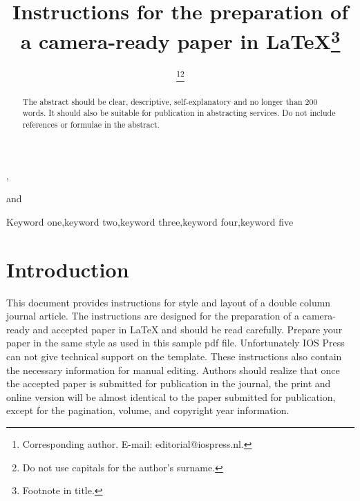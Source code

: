 \documentclass{iosart2c}
\begin{document}
\begin{frontmatter}                           %

%
\title{Instructions for the preparation of a camera-ready paper in \LaTeX\thanks{Footnote in title.}}




\author[A]{ \thanks{Corresponding author. E-mail: editorial@iospress.nl.}\thanks{Do not use capitals for the author's surname.}},
\author[B]{ }
and
\author[B]{ }
\address[A]{Journal Production Department, IOS Press, Nieuwe Hemweg 6b, 1013 BG, Amsterdam,\\ The Netherlands\\
E-mail: first@somewhere.com}
\address[B]{Department first, then University or Company name, Insert a complete correspondence (mailing) address,
Abbreviate US states, Include country\\
E-mail: \{second,third\}@somewhere.com}

\begin{abstract}
The abstract should be clear, descriptive, self-explanatory and no longer than 200 words. It should also
be suitable for publication in abstracting services. Do not include references or formulae in the abstract.
\end{abstract}

\begin{keyword}
Keyword one\sep keyword two\sep keyword three\sep keyword four\sep keyword five
\end{keyword}

\end{frontmatter}



\section{Introduction}
This document provides instructions for style and layout of a double column journal article.
The instructions are designed for the preparation of a camera-ready and accepted paper in \LaTeX{} and should be read carefully.
Prepare your paper in the same style as used in this sample pdf file.
Unfortunately IOS Press can not give technical support on the template.
These instructions also contain the necessary information for manual editing. Authors should realize that once the accepted
paper is submitted for publication in the journal, the print and online version will be almost identical to the paper submitted
for publication, except for the pagination, volume, and copyright year
information.
\end{document}
